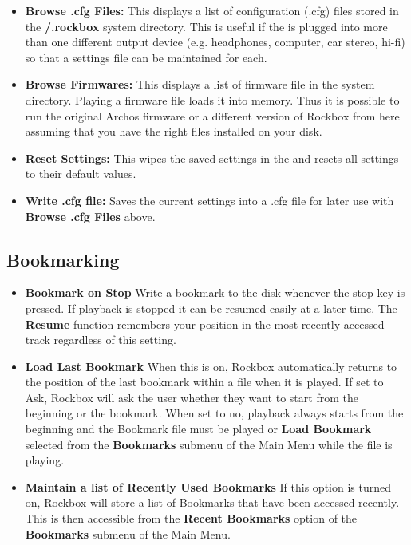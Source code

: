 \begin{itemize}
\begin{itemize}
    \begin{itemize}
    \item \textbf{Browse .cfg Files: }
      This displays a list of configuration (.cfg) files stored in the \textbf{/.rockbox} system directory.  This is useful if the \dap is plugged into more than one different output device (e.g. headphones, computer, car stereo, hi{}-fi) so that a settings file can be maintained for each.
    \item \textbf{Browse Firmwares:} 
      This displays a list of firmware file in the  system directory. Playing a firmware file loads it into memory.  Thus it is possible to run the original Archos firmware or a different version of Rockbox from here assuming that you have the right files installed on your disk.
    \item \textbf{Reset Settings: }
      This wipes the saved settings in the \dap and resets all settings to their default values.
    \item \textbf{Write .cfg file: }
      Saves the current settings into a .cfg file for later use with \textbf{Browse .cfg Files} above.
    \end{itemize}
    
  \end{itemize}

  \subsection{\label{ref:Bookmarkconfigactual}Bookmarking}
  
  \begin{itemize}
  \item \textbf{Bookmark on Stop}
    Write a bookmark to the disk whenever the stop key is pressed.  If playback is stopped it can be resumed easily at a later time. The \textbf{Resume} function remembers your position in the most recently accessed track regardless of this setting.
  \item \textbf{Load Last Bookmark}
    When this is on, Rockbox automatically returns to the position of the last bookmark within a file when it is played.  If set to Ask, Rockbox will ask the user whether they want to start from the beginning or the bookmark.  When set to no, playback always starts from the beginning and the Bookmark file must be played or \textbf{Load Bookmark} selected from the \textbf{Bookmarks} submenu of the Main Menu while the file is playing.
  \item \textbf{Maintain a list of Recently Used Bookmarks}
    If this option is turned on, Rockbox will store a list of Bookmarks that have been accessed recently.  This is then accessible from the \textbf{Recent Bookmarks} option of the \textbf{Bookmarks} submenu of the Main Menu.
  \end{itemize}
  

\end{itemize}
